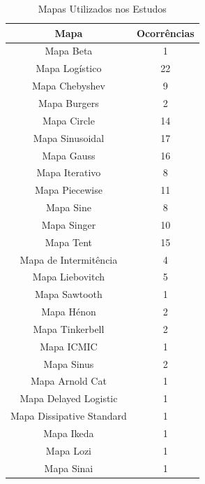 
{\tiny
\begin{table}[!htpb]
    \centering
    \begin{tabular}{c|c} %
      \textbf{Mapa} & \textbf{Ocorrências} \\
      \hline
      Mapa Beta & 1\\
      \hline
    Mapa Logístico & 22\\
    \hline
    Mapa Chebyshev & 9 \\
    \hline
    Mapa Burgers & 2\\
    \hline
    Mapa Circle  & 14\\
    \hline
    Mapa Sinusoidal  & 17\\
    \hline
    Mapa Gauss & 16\\
    \hline
    Mapa Iterativo & 8\\
    \hline
    Mapa Piecewise & 11\\
    \hline
    Mapa Sine & 8\\
    \hline
    Mapa Singer  & 10\\
    \hline
    Mapa Tent & 15\\
    \hline
    Mapa de Intermitência & 4\\
    \hline
    Mapa Liebovitch & 5\\
    \hline
    Mapa Sawtooth & 1\\
    \hline
    Mapa Hénon & 2\\
    \hline
    Mapa Tinkerbell  & 2\\
    \hline
    Mapa ICMIC & 1\\
    \hline
    Mapa Sinus & 2\\
    \hline
    Mapa Arnold Cat & 1\\
    \hline
    Mapa Delayed Logistic & 1\\
    \hline
    Mapa Dissipative Standard & 1\\
    \hline
    Mapa Ikeda & 1\\
    \hline
    Mapa Lozi & 1\\
    \hline
    Mapa Sinai & 1\\
    \end{tabular}
    \caption{Mapas Utilizados nos Estudos}
    \label{tab:grafMapas}
\end{table}
}

